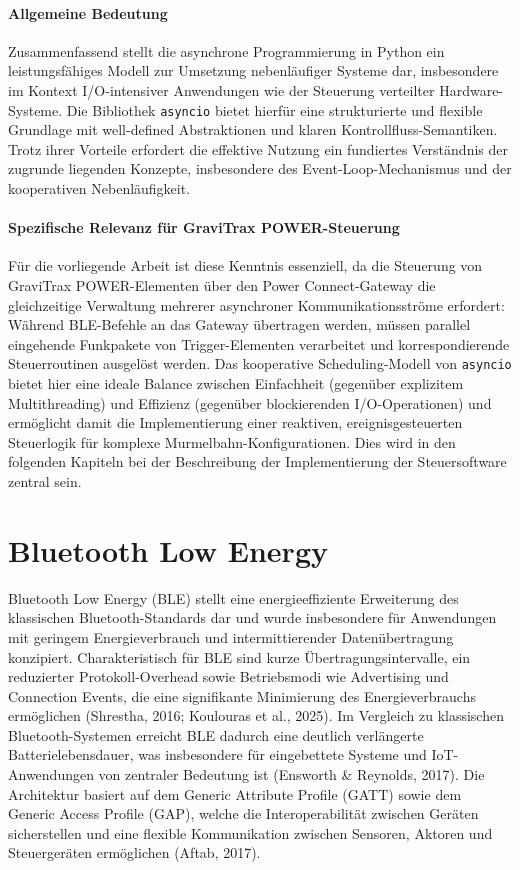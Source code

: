 \paragraph{Allgemeine Bedeutung}
Zusammenfassend stellt die asynchrone Programmierung in Python ein leistungsfähiges Modell zur Umsetzung nebenläufiger Systeme dar, insbesondere im Kontext I/O-intensiver Anwendungen wie der Steuerung verteilter Hardware-Systeme.
Die Bibliothek \texttt{asyncio} bietet hierfür eine strukturierte und flexible Grundlage mit well-defined Abstraktionen und klaren Kontrollfluss-Semantiken.
Trotz ihrer Vorteile erfordert die effektive Nutzung ein fundiertes Verständnis der zugrunde liegenden Konzepte, insbesondere des Event-Loop-Mechanismus und der kooperativen Nebenläufigkeit.

\paragraph{Spezifische Relevanz für GraviTrax POWER-Steuerung}
Für die vorliegende Arbeit ist diese Kenntnis essenziell, da die Steuerung von GraviTrax POWER-Elementen über den Power Connect-Gateway die gleichzeitige Verwaltung mehrerer asynchroner Kommunikationsströme erfordert: Während BLE-Befehle an das Gateway übertragen werden, müssen parallel eingehende Funkpakete von Trigger-Elementen verarbeitet und korrespondierende Steuerroutinen ausgelöst werden.
Das kooperative Scheduling-Modell von \texttt{asyncio} bietet hier eine ideale Balance zwischen Einfachheit (gegenüber explizitem Multithreading) und Effizienz (gegenüber blockierenden I/O-Operationen) und ermöglicht damit die Implementierung einer reaktiven, ereignisgesteuerten Steuerlogik für komplexe Murmelbahn-Konfigurationen.
Dies wird in den folgenden Kapiteln bei der Beschreibung der Implementierung der Steuersoftware zentral sein.

\section{Bluetooth Low Energy}
Bluetooth Low Energy (BLE) stellt eine energieeffiziente Erweiterung des klassischen Bluetooth-Standards dar und wurde insbesondere für Anwendungen mit geringem Energieverbrauch und intermittierender Datenübertragung konzipiert. Charakteristisch für BLE sind kurze Übertragungsintervalle, ein reduzierter Protokoll-Overhead sowie Betriebsmodi wie Advertising und Connection Events, die eine signifikante Minimierung des Energieverbrauchs ermöglichen (Shrestha, 2016; Koulouras et al., 2025). Im Vergleich zu klassischen Bluetooth-Systemen erreicht BLE dadurch eine deutlich verlängerte Batterielebensdauer, was insbesondere für eingebettete Systeme und IoT-Anwendungen von zentraler Bedeutung ist (Ensworth & Reynolds, 2017). Die Architektur basiert auf dem Generic Attribute Profile (GATT) sowie dem Generic Access Profile (GAP), welche die Interoperabilität zwischen Geräten sicherstellen und eine flexible Kommunikation zwischen Sensoren, Aktoren und Steuergeräten ermöglichen (Aftab, 2017).

